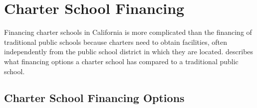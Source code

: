 \section{Charter School Financing}\label{sec:findings-charter-financing}\indent

Financing charter schools in California is more complicated than the financing of traditional public schools because charters need to obtain facilities, often independently from the public school district in which they are located.
  describes what financing options a charter school has compared to a traditional public school.

\subsection{Charter School Financing Options}\indent\label{sec:charter-school-financing-options}


